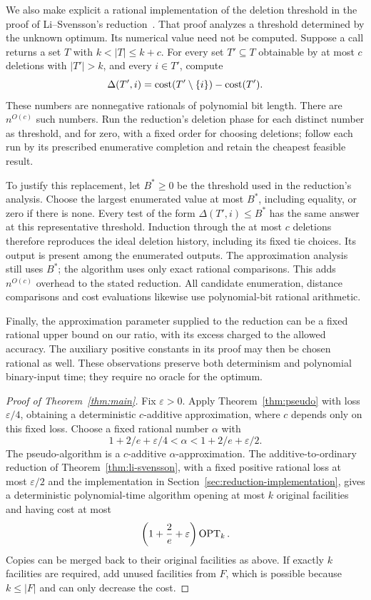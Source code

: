 We also make explicit a rational implementation of the deletion threshold
in the proof of Li--Svensson's reduction~\cite[Section~2, Algorithm~2]{LiSvensson2016}.
That proof analyzes a threshold determined by the unknown optimum.
Its numerical value need not be computed. Suppose a call returns a set
\(T\) with \(k<|T|\le k+c\). For every set \(T'\subseteq T\) obtainable
by at most \(c\) deletions with \(|T'|>k\), and every \(i\in T'\), compute
\[
 \Delta(T',i)=\operatorname{cost}(T'\setminus\{i\})-\operatorname{cost}(T').
\]
These numbers are nonnegative rationals of polynomial bit length.
There are \(n^{O(c)}\) such numbers. Run the reduction's deletion phase
for each distinct number as threshold, and for zero, with a fixed order
for choosing deletions; follow each run by its prescribed enumerative
completion and retain the cheapest feasible result.

To justify this replacement, let \(B^*\ge0\) be the threshold used in
the reduction's analysis. Choose the largest enumerated value at most
\(B^*\), including equality, or zero if there is none. Every test of the form
\(\Delta(T',i)\le B^*\) has the same answer at this representative
threshold. Induction through the at most \(c\) deletions therefore
reproduces the ideal deletion history, including its fixed tie choices.
Its output is present among the enumerated outputs. The approximation
analysis still uses \(B^*\); the algorithm uses only exact rational
comparisons. This adds \(n^{O(c)}\) overhead to the stated reduction.
All candidate enumeration, distance comparisons and cost evaluations
likewise use polynomial-bit rational arithmetic.

Finally, the approximation parameter supplied to the reduction can be a
fixed rational upper bound on our ratio, with its excess charged to the
allowed accuracy. The auxiliary positive constants in its proof may then
be chosen rational as well. These observations preserve both determinism
and polynomial binary-input time; they require no oracle for the optimum.

\begin{proof}[Proof of Theorem~\ref{thm:main}]
Fix \(\varepsilon>0\). Apply Theorem~\ref{thm:pseudo} with
loss \(\varepsilon/4\), obtaining a deterministic
\(c\)-additive approximation, where \(c\) depends only on this fixed
loss. Choose a fixed rational number \(\alpha\) with
\[
 1+2/e+\varepsilon/4<\alpha<1+2/e+\varepsilon/2.
\]
The pseudo-algorithm is a \(c\)-additive \(\alpha\)-approximation.
The additive-to-ordinary reduction of Theorem~\ref{thm:li-svensson},
with a fixed positive rational loss at most \(\varepsilon/2\) and the
implementation in Section~\ref{sec:reduction-implementation},
gives a deterministic polynomial-time
algorithm opening at most \(k\) original facilities and having
cost at most
\[
 \left(1+\frac2e+\varepsilon\right)\operatorname{OPT}_k.
\]
Copies can be merged back to their original facilities as above.
If exactly \(k\) facilities are required, add unused facilities
from \(F\), which is possible because \(k\le|F|\) and can only
decrease the cost.

\end{proof}

